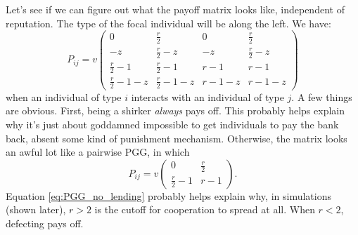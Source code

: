 \documentclass[14pt, a4paper, justified]{article}
\begin{document}
Let's see if we can figure out what the payoff matrix looks like, independent of reputation.
The type of the focal individual will be along the left.
We have:
\begin{equation}
    P_{ij} = v
    \begin{pmatrix}
        0 & \frac{r}{2} & 0 & \frac{r}{2} \\
        -z & \frac{r}{2} - z & -z & \frac{r}{2} - z \\
        \frac{r}{2} - 1 & \frac{r}{2} - 1 & r - 1 & r - 1 \\
        \frac{r}{2} - 1 - z & \frac{r}{2} - 1 - z  & r - 1 - z & r - 1 - z
    \end{pmatrix}
    \label{eq:PGG_lending}
\end{equation}
when an individual of type $i$ interacts with an individual of type $j$.
A few things are obvious.
First, being a shirker \emph{always} pays off.
This probably helps explain why it's just about goddamned impossible to get individuals to pay the bank back, absent some kind of punishment mechanism.
Otherwise, the matrix looks an awful lot like a pairwise PGG, in which
\begin{equation}
    P_{ij} = v
    \begin{pmatrix}
        0 & \frac{r}{2} \\
        \frac{r}{2} - 1 & r - 1
    \end{pmatrix}.
    \label{eq:PGG_no_lending}
\end{equation}
Equation \ref{eq:PGG_no_lending} probably helps explain why, in simulations (shown later), $r > 2$ is the cutoff for cooperation to spread at all.
When $r < 2$, defecting pays off.
\end{document}
